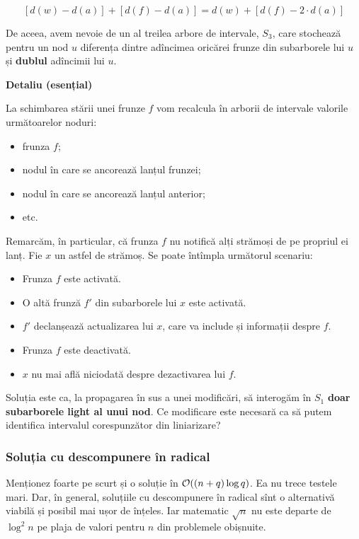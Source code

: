 \documentclass[../main.tex]{subfiles}
\begin{document}
$$[d(w)-d(a)] + [d(f) - d(a)] = d(w) + [d(f) - 2 \cdot d(a)]$$

De aceea, avem nevoie de un al treilea arbore de intervale, $S_3$, care stochează pentru un nod $u$ diferența dintre adîncimea oricărei frunze din subarborele lui $u$ și \textbf{dublul} adîncimii lui $u$.

\textbf{Detaliu (esențial)}

La schimbarea stării unei frunze $f$ vom recalcula în arborii de intervale valorile următoarelor noduri:

\begin{itemize}
  \item frunza $f$;
  \item nodul în care se ancorează lanțul frunzei;
  \item nodul în care se ancorează lanțul anterior;
  \item etc.
\end{itemize}

Remarcăm, în particular, că frunza $f$ nu notifică alți strămoși de pe propriul ei lanț. Fie $x$ un astfel de strămoș. Se poate întîmpla următorul scenariu:

\begin{itemize}
  \item Frunza $f$ este activată.
  \item O altă frunză $f'$ din subarborele lui $x$ este activată.
  \item $f'$ declanșează actualizarea lui $x$, care va include și informații despre $f$.
  \item Frunza $f$ este deactivată.
  \item $x$ nu mai află niciodată despre dezactivarea lui $f$.
\end{itemize}

Soluția este ca, la propagarea în sus a unei modificări, să interogăm în $S_1$ \textbf{doar subarborele light al unui nod}. Ce modificare este necesară ca să putem identifica intervalul corespunzător din liniarizare?

\subsubsection*{Soluția cu descompunere în radical}

Menționez foarte pe scurt și o soluție în $\mathcal{O}((n + q) \log q)$. Ea nu trece testele mari. Dar, în general, soluțiile cu descompunere în radical sînt o alternativă viabilă și posibil mai ușor de înțeles. Iar matematic $\sqrt{n}$ nu este departe de $\log^2 n$ pe plaja de valori pentru $n$ din problemele obișnuite.
\end{document}
